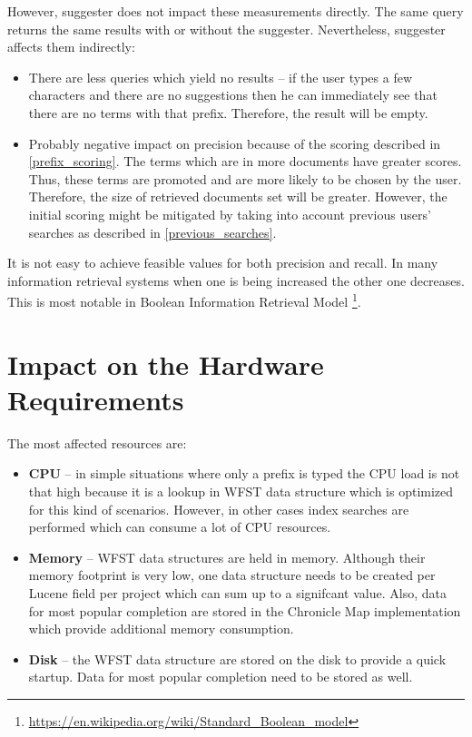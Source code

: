 However, suggester does not impact these measurements directly. The same query returns the same results with or without
the suggester. Nevertheless, suggester affects them indirectly:
\begin{itemize}
    \item There are less queries which yield no results – if the user types a few characters and there are no suggestions then he
    can immediately see that there are no terms with that prefix. Therefore, the result will be empty.
    \item Probably negative impact on precision because of the scoring described in \ref{prefix_scoring}. The terms which
    are in more documents have greater scores. Thus, these terms are promoted and are more likely to be chosen by the user.
    Therefore, the size of retrieved documents set will be greater. However, the initial scoring might be mitigated
    by taking into account previous users' searches as described in \ref{previous_searches}.
\end{itemize}

It is not easy to achieve feasible values for both precision and recall. In many information retrieval systems when one is
being increased the other one decreases. This is most notable in Boolean Information Retrieval Model
\footnote{\url{https://en.wikipedia.org/wiki/Standard\_Boolean\_model}}.

\section{Impact on the Hardware Requirements}
\label{hw_req_impact}
The most affected resources are:
\begin{itemize}
    \item \textbf{CPU} – in simple situations where only a prefix is typed the CPU load is not that high because it
    is a lookup in WFST data structure which is optimized for this kind of scenarios. However, in other cases
    index searches are performed which can consume a lot of CPU resources.
    \item \textbf{Memory} – WFST data structures are held in memory. Although their memory footprint is very low,
    one data structure needs to be created per Lucene field per project which can sum up to a signifcant value.
    Also, data for most popular completion are stored in the Chronicle Map implementation which provide additional
    memory consumption.
    \item \textbf{Disk} – the WFST data structure are stored on the disk to provide a quick startup.
    Data for most popular completion need to be stored as well.
\end{itemize}

